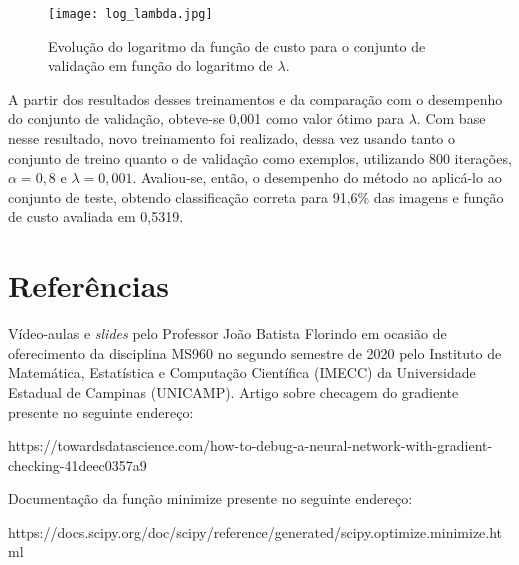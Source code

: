 \documentclass[12pt]{article}
\begin{document}
\begin{figure}
\begin{center}
\texttt{[image: log\_lambda.jpg]}
\caption{Evolução do logaritmo da função de custo para o conjunto de validação em função do logaritmo de $\lambda$.} \label{log_lambda}
\end{center}
\end{figure}

A partir dos resultados desses treinamentos e da comparação com o desempenho do conjunto de validação, obteve-se 0,001 como valor ótimo para $\lambda$. Com base nesse resultado, novo treinamento foi realizado, dessa vez usando tanto o conjunto de treino quanto o de validação como exemplos, utilizando 800 iterações, $\alpha=0,8$ e $\lambda=0,001$. Avaliou-se, então, o desempenho do método ao aplicá-lo ao conjunto de teste, obtendo classificação correta para 91,6\% das imagens e função de custo avaliada em 0,5319.


\section{Referências}
Vídeo-aulas e \textit{slides} pelo Professor João Batista Florindo em ocasião de oferecimento da disciplina MS960 no segundo semestre de 2020 pelo Instituto de Matemática, Estatística e Computação Científica (IMECC) da Universidade Estadual de Campinas (UNICAMP). Artigo sobre checagem do gradiente presente no seguinte endereço:

https://towardsdatascience.com/how-to-debug-a-neural-network-with-gradient-checking-41deec0357a9

Documentação da função minimize presente no seguinte endereço:

https://docs.scipy.org/doc/scipy/reference/generated/scipy.optimize.minimize.html
\end{document}
